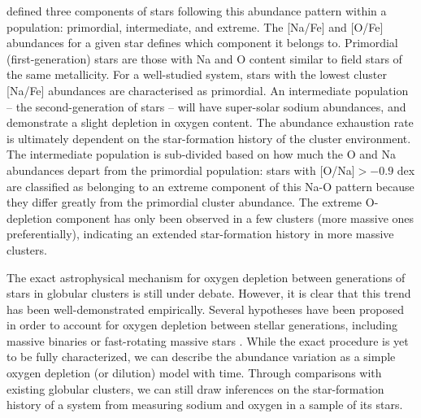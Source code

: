 \documentclass{emulateapj}
\begin{document}
\citet{Caretta;et-al_2009} defined three components of stars following this abundance pattern within a population: primordial, intermediate, and extreme. The [Na/Fe] and [O/Fe] abundances for a given star defines which component it belongs to. Primordial (first-generation) stars are those with Na and O content similar to field stars of the same metallicity. For a well-studied system, stars with the lowest cluster [Na/Fe] abundances are characterised as primordial. An intermediate population -- the second-generation of stars -- will have super-solar sodium abundances, and demonstrate a slight depletion in oxygen content. The  abundance exhaustion rate is ultimately dependent on the star-formation history of the cluster environment. The intermediate population is sub-divided based on how much the O and Na abundances depart from the primordial population: stars with [O/Na]$ > -0.9$ dex are classified as belonging to an extreme component of this Na-O pattern because they differ greatly from the primordial cluster abundance. The extreme O-depletion component has only been observed in a few clusters (more massive ones preferentially), indicating an extended star-formation history in more massive clusters.



The exact astrophysical mechanism for oxygen depletion between generations of stars in globular clusters is still under debate. However, it is clear that this trend has been well-demonstrated empirically. Several hypotheses have been proposed in order to account for oxygen depletion between stellar generations, including massive binaries \citep{De_Mink;et-al_2009} or fast-rotating massive stars \citep{decressin;et-al_2007}. While the exact procedure is yet to be fully characterized, we can describe the abundance variation as a simple oxygen depletion (or dilution) model with time. Through comparisons with existing globular clusters, we can still draw inferences on the star-formation history of a system from measuring sodium and oxygen in a sample of its stars.

\end{document}
